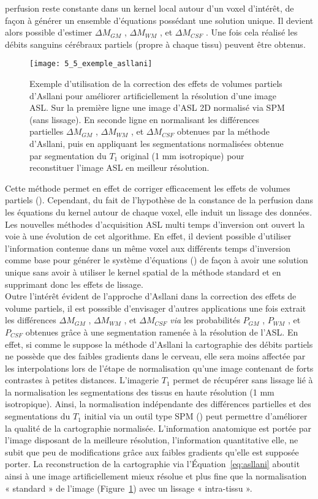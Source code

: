 perfusion reste constante dans un kernel local autour d’un voxel d’intérêt, de façon à générer un
ensemble d’équations possédant une solution unique. Il devient alors possible d’estimer $\Delta M_{GM}$ , $\Delta M_{WM}$  , et $\Delta M_{CSF}$ . Une fois cela réalisé les débits sanguins cérébraux partiels (propre à chaque tissu)
peuvent être obtenus.\\
\begin{figure}[!t]
\centering
\texttt{[image: 5\_5\_exemple\_asllani]}
\caption{Exemple d'utilisation de la correction des effets de volumes partiels d’Asllani pour améliorer
artificiellement la résolution d’une image ASL. Sur la première ligne une image d’ASL 2D normalisé via SPM
(sans lissage). En seconde ligne en normalisant les différences partielles $\Delta M_{GM}$ , $\Delta M_{WM}$  , et $\Delta M_{CSF}$ obtenues
par la méthode d’Asllani, puis en appliquant les segmentations normalisées obtenue par segmentation du $T_1$
original (1 mm isotropique) pour reconstituer l’image ASL en meilleur résolution.
}
\label{fig:5_5_exemple_asllani}	
\end{figure}
Cette méthode permet en effet de corriger efficacement les effets de volumes partiels (\cite{Asllani2008}).
Cependant, du fait de l’hypothèse de la constance de la perfusion dans les équations du kernel autour
de chaque voxel, elle induit un lissage des données. Les nouvelles méthodes d’acquisition ASL multi
temps d’inversion ont ouvert la voie à une évolution de cet algorithme. En effet, il devient possible
d’utiliser l’information contenue dans un même voxel aux différents temps d’inversion comme base
pour générer le système d’équations (\cite{Chappell2011}) de façon à avoir une solution unique sans avoir à utiliser le
kernel spatial de la méthode standard et en supprimant donc les effets de lissage.\\
Outre l’intérêt évident de l’approche d’Asllani dans la correction des effets de volume partiels,
il est posssible d’envisager d’autres applications une fois extrait les différences $\Delta M_{GM}$ , $\Delta M_{WM}$  , et $\Delta M_{CSF}$ {\em via} les probabilités $P_{GM}$ , $P_{WM}$ , et $P_{CSF}$ obtenues grâce à une segmentation ramenée à la résolution
de l’ASL. En effet, si comme le suppose la méthode d’Asllani la cartographie des débits partiels ne
possède que des faibles gradients dans le cerveau, elle sera moins affectée par les interpolations lors
de l’étape de normalisation qu’une image contenant de forts contrastes à petites distances. L’imagerie
$T_1$ permet de récupérer sans lissage lié à la normalisation les segmentations des tissus en haute
résolution (1 mm isotropique). Ainsi, la normalisation indépendante des différences partielles et des
segmentations du $T_1$ initial via un outil type SPM (\cite{Friston2006}) peut permettre d’améliorer la qualité de la
cartographie normalisée. L’information anatomique est portée par l’image disposant de la meilleure
résolution, l’information quantitative elle, ne subit que peu de modifications grâce aux faibles
gradients qu’elle est supposée porter. La reconstruction de la cartographie via l’Équation~\ref{eq:asllani} aboutit
ainsi à une image artificiellement mieux résolue et plus fine que la normalisation « standard » de
l’image (Figure~\ref{fig:5_5_exemple_asllani}) avec un lissage « intra-tissu ».
